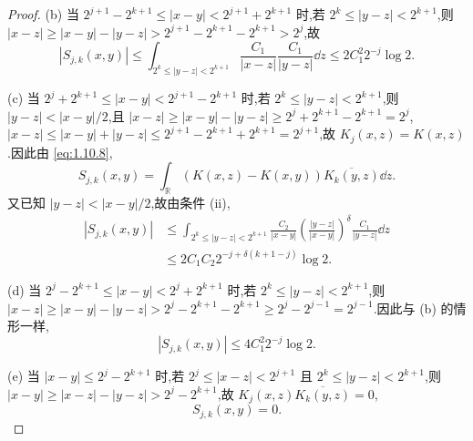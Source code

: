 \begin{proof}
(b) 当 $2^{j+1} - 2^{k+1} \leq |x - y| < 2^{j+1} + 2^{k+1}$ 时,若 $2^{k} \leq |y - z| < 2^{k+1}$,则 $|x - z| \geq |x - y| - |y - z| > 2^{j+1} - 2^{k+1} - 2^{k+1} > 2^{j}$,故
\begin{equation*}
|S_{j,k}(x, y)| \leq \int_{2^{k} \leq |y - z| < 2^{k+1}}\frac{C_{1}}{|x - z|}\frac{C_{1}}{|y - z|}\dd z \leq 2C_{1}^{2}2^{-j}\log 2.
\end{equation*}

(c) 当 $2^{j} + 2^{k+1} \leq |x - y| < 2^{j+1} - 2^{k+1}$ 时,若 $2^{k} \leq |y - z| < 2^{k+1}$,则 $|y - z| < |x - y|/2$,且 $|x - z| \geq |x - y| - |y - z| \geq 2^{j} + 2^{k+1} - 2^{k+1} = 2^{j}$,$|x - z| \leq |x - y| + |y - z| \leq 2^{j+1} - 2^{k+1} + 2^{k+1} = 2^{j+1}$,故 $K_{j}(x, z) = K(x, z)$.因此由 \eqref{eq:1.10.8},
\begin{equation*}
S_{j,k}(x, y) = \int_{\mathbb{R}}\left(K(x, z) - K(x, y)\right)\overline{K_{k}(y, z)}\dd z.
\end{equation*}
又已知 $|y - z| < |x - y|/2$,故由条件 (ii),
\begin{align*}
|S_{j,k}(x, y)| &\leq \displaystyle\int_{2^{k} \leq |y - z| < 2^{k+1}}\frac{C_{2}}{|x - y|}\left(\frac{|y - z|}{|x - y|}\right)^{\delta}\frac{C_{1}}{|y - z|}\dd z \\
&\leq 2C_{1}C_{2}2^{-j + \delta(k + 1 - j)}\log 2.
\end{align*}

(d) 当 $2^{j} - 2^{k+1} \leq |x - y| < 2^{j} + 2^{k+1}$ 时,若 $2^{k} \leq |y - z| < 2^{k+1}$,则 $|x - z| \geq |x - y| - |y - z| > 2^{j} - 2^{k+1} - 2^{k+1} \geq 2^{j} - 2^{j-1} = 2^{j-1}$.因此与 (b) 的情形一样,
\begin{equation*}
|S_{j,k}(x, y)| \leq 4C_{1}^{2}2^{-j}\log 2.
\end{equation*}

(e) 当 $|x - y| \leq 2^{j} - 2^{k+1}$ 时,若 $2^{j} \leq |x - z| < 2^{j+1}$ 且 $2^{k} \leq |y - z| < 2^{k+1}$,则 $|x - y| \geq |x - z| - |y - z| > 2^{j} - 2^{k+1}$,故 $K_{j}(x, z)\overline{K_{k}(y, z)} = 0$,
\begin{equation*}
S_{j,k}(x, y) = 0.
\end{equation*}


\end{proof}

